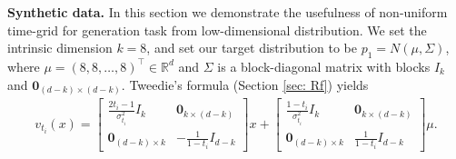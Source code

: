 \documentclass{article}
\theoremstyle{plain}
\theoremstyle{definition}
\theoremstyle{remark}
\def\bbR{\mathbb{R}}
\newcommand{\rd}{\color{red}}
\newcommand{\bk}{\color{black}}
\begin{document}
\textbf{Synthetic data.}
In this section we demonstrate the usefulness of non-uniform time-grid for generation task from low-dimensional distribution.
We set the intrinsic dimension $k =8$, and set our target distribution to be $p_1 = N(\mu, \Sigma)$, where $\mu = (8, 8, \ldots, 8)^\top \in \bbR^d$  and $\Sigma$ is a block-diagonal matrix with blocks $I_{k}$ and $ \boldsymbol{0}_{(d-k) \times (d-k)}$. 
Tweedie's formula (Section \ref{sec: Rf}) yields
\begin{equation}
\label{eq: low-dim velocity field}
\begin{aligned}
 v_{t_i}(x) 
 = \begin{bmatrix}
    \frac{2t_i-1}{\sigma_{t_i}^2} I_k & \boldsymbol{0}_{k \times (d-k)}\\
    \boldsymbol{0}_{(d-k) \times k} & - \frac{1}{1-t_i}I_{d-k}
\end{bmatrix} x
+ \begin{bmatrix}
    \frac{1-t_i}{\sigma_{t_i}^2} I_k  & \boldsymbol{0}_{k \times (d-k)}\\
    \boldsymbol{0}_{(d-k) \times k} & \frac{1}{1 - t_i} I_{d-k}
\end{bmatrix} \mu.
\end{aligned}
\end{equation}

\end{document}
